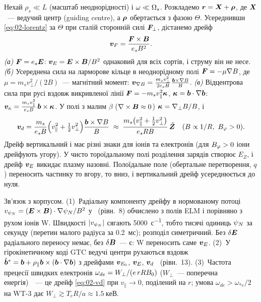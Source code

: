 \begin{outofcorpus}
Нехай $\rho_s\ll L$ (масштаб неоднорідності) і $\omega\ll\Omega_{s}$. Розкладемо $\bm{r}=\bm{X}+\bm{\rho}$, де $\bm{X}$~--- ведучий центр (guiding centre), а $\bm{\rho}$ обертається з фазою $\Theta$. Усереднивши \eqref{eq:02-lorentz} за $\Theta$ при сталій сторонній силі $\bm{F}_\perp$, дістанемо дрейф
\begin{equation}\label{eq:02-Fdrift}
  \bm{v}_F=\frac{\bm{F}\times\bm{B}}{e_sB^2}.
\end{equation}
\emph{(а)} $\bm{F}=e_s\bm{E}$: $\bm{v}_{E}=\bm{E}\times\bm{B}/B^2$ однаковий для всіх сортів, і струму він не несе. \emph{(б)} Усереднена сила на ларморове кільце в неоднорідному полі $\bm{F}=-\mu\nabla B$, де $\mu=m_sv_\perp^2/(2B)$~--- магнітний момент: $\bm{v}_{\nabla B}=\frac{m_sv_\perp^2}{2e_sB}\frac{\bm{b}\times\nabla B}{B}$. \emph{(в)} Відцентрова сила при русі вздовж викривленої лінії $\bm{F}=-m_sv_\parallel^2\bm{\kappa}$, $\bm{\kappa}=\bm{b}\cdot\nabla\bm{b}$: $\bm{v}_\kappa=\frac{m_sv_\parallel^2}{e_sB}\,\bm{b}\times\bm{\kappa}$. У полі з малим $\beta$ ($\nabla\times\bm{B}\approx0$) $\bm{\kappa}=\nabla_\perp B/B$, і
\begin{equation}\label{eq:02-vd}
  \vect{v}_d=\frac{m_s}{e_sB}\Bigl(v_\parallel^2+\tfrac12v_\perp^2\Bigr)\frac{\unitb\times\grad B}{B}\;\approx\;\frac{m_s\bigl(v_\parallel^2+\tfrac12v_\perp^2\bigr)}{e_sRB}\,\hat{\vect{Z}}\quad(B\propto1/R,\ \Btor>0).
\end{equation}
Дрейф вертикальний і має різні знаки для іонів та електронів (для $B_{\varphi}>0$ іони дрейфують угору). У чисто тороїдальному полі розділення зарядів створює $E_Z$, і дрейф $\bm{v}_{E}$ викидає плазму назовні. Полоїдальне поле (обертальне перетворення, $q$) переносить частинку то вгору, то вниз, і вертикальний дрейф усереднюється до нуля.
\end{outofcorpus}

Зв'язок з корпусом. (1)~Радіальну компоненту дрейфу в нормованому потоці $v_{\psi_{N}}=(\bm{E}\times\bm{B})\cdot\nabla\psi_{N}/B^2$ у~\cite{vanVugt2019} (рівн.~8) обчислено з полів ELM і порівняно з рухом іонів W. Швидкості $|v_{\psi_{N}}|$ сягають \SI{5000}{с^{-1}}, тобто тисячі одиниць $\psi_{N}$ за секунду (перетин малого радіуса за \SI{0,2}{мс}); розподіл симетричний. Без $\delta\bm{E}$ радіального переносу немає, без $\delta\bm{B}$~--- є: W переносить саме $\bm{v}_{E}$. (2)~У гірокінетичному коді GTC ведучі центри рухаються вздовж $\hat{\bm{b}}^*=\bm{b}+\rho_\parallel\bm{b}\times(\bm{b}\cdot\nabla\bm{b})$ з дрейфами $\bm{v}_{E_0}$, $\bm{v}_{E}$, $\bm{v}_d$~\cite{Wang2006} (рівн.~13). (3)~Частота прецесії швидких електронів $\omega_{de}=W_\perp/(e\,rRB_{0})$ ($W_\perp$~--- поперечна енергія)~\cite{Hanada1990}~--- це дрейф \eqref{eq:02-vd} при $v_\parallel\to0$, поділений на $r$; умова $\omega_{de}>\omega_{*e}/2$ на WT-3 дає $W_\perp\gtrsim T_eR/a\approx\SI{1,5}{кеВ}$.

